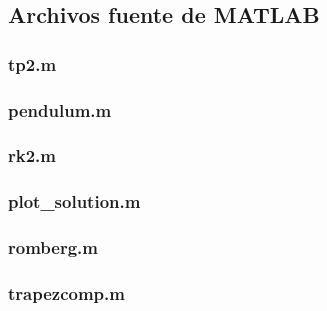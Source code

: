 \lstset{numbersep=5pt}

\lstset{inputencoding=cp1252}



\fontsize{9pt}{10pt}
\selectfont







\subsection{Archivos fuente de \textbf{MATLAB}}
\label{apendix:files}
\subsubsection{tp2.m}
\label{apendix:file_tp2}

\clearpage

\subsubsection{pendulum.m}
\label{apendix:file_pendulum}

\clearpage

\subsubsection{rk2.m}
\label{apendix:file_rk4}

\clearpage

\subsubsection{plot\_solution.m}
\label{apendix:file_pts}

\clearpage

\subsubsection{romberg.m}
\label{apendix:file_romberg}

\clearpage

\subsubsection{trapezcomp.m}
\label{apendix:file_trapezcomp}

\clearpage

\normalfont
\normalsize







